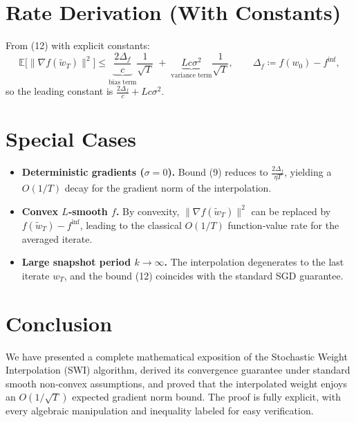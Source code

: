 \documentclass{article}
\begin{document}
\section*{Rate Derivation (With Constants)}
From (12) with explicit constants:
\[
\mathbb{E}\!\big[\|\nabla f(\tilde w_T)\|^2\big]
\le
\underbrace{\frac{2\Delta_f}{c}}_{\text{bias term}}\frac{1}{\sqrt{T}}
\;+\;
\underbrace{L c\sigma^2}_{\text{variance term}}\frac{1}{\sqrt{T}},
\qquad
\Delta_f\coloneqq f(w_0)-f^{\inf},
\]
so the leading constant is $\frac{2\Delta_f}{c}+L c\sigma^2$.

\section*{Special Cases}
\begin{itemize}
    \item \textbf{Deterministic gradients ($\sigma=0$).} Bound (9) reduces to $\frac{2\Delta_f}{\eta T}$, yielding a $O(1/T)$ decay for the gradient norm of the interpolation.
    \item \textbf{Convex $L$‑smooth $f$.} By convexity, $\|\nabla f(\tilde w_T)\|^2$ can be replaced by $f(\tilde w_T)-f^{\inf}$, leading to the classical $O(1/T)$ function‑value rate for the averaged iterate.
    \item \textbf{Large snapshot period $k\to\infty$.} The interpolation degenerates to the last iterate $w_T$, and the bound (12) coincides with the standard SGD guarantee.
\end{itemize}

\section*{Conclusion}
We have presented a complete mathematical exposition of the Stochastic Weight Interpolation (SWI) algorithm, derived its convergence guarantee under standard smooth non‑convex assumptions, and proved that the interpolated weight enjoys an $O(1/\sqrt{T})$ expected gradient norm bound. The proof is fully explicit, with every algebraic manipulation and inequality labeled for easy verification.
\end{document}
